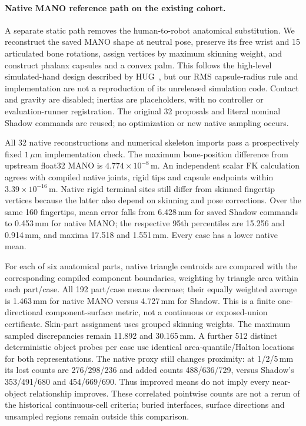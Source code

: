 \documentclass[10pt,letterpaper]{article}
\begin{document}
\paragraph{Native MANO reference path on the existing cohort.}
A separate static path removes the human-to-robot anatomical substitution.
We reconstruct the saved MANO shape at neutral pose, preserve its free wrist
and 15 articulated bone rotations, assign vertices by maximum skinning
weight, and construct phalanx capsules and a convex palm. This follows the
high-level simulated-hand design described by HUG~\cite{hug}, but our RMS
capsule-radius rule and implementation are not a reproduction of its
unreleased simulation code. Contact and gravity are disabled; inertias are
placeholders, with no controller or evaluation-runner registration.
The original 32 proposals and literal nominal Shadow commands are reused;
no optimization or new native sampling occurs.

All 32 native reconstructions and numerical skeleton imports pass a
prospectively fixed $1\,\mu$m implementation check. The maximum bone-position
difference from upstream float32 MANO is $4.774\times10^{-8}$\,m. An independent
scalar FK calculation agrees with compiled native joints, rigid tips and
capsule endpoints within $3.39\times10^{-16}$\,m. Native rigid terminal sites
still differ from skinned fingertip vertices because the latter also depend
on skinning and pose corrections. Over the same 160 fingertips, mean error
falls from 6.428\,mm for saved Shadow commands to 0.453\,mm for native MANO;
the respective 95th percentiles are 15.256 and 0.914\,mm, and maxima 17.518
and 1.551\,mm. Every case has a lower native mean.

For each of six anatomical parts, native triangle centroids are compared
with the corresponding compiled component boundaries, weighting by triangle
area within each part/case. All 192 part/case means decrease; their equally
weighted average is 1.463\,mm for native MANO versus 4.727\,mm for Shadow.
This is a finite one-directional component-surface metric, not a continuous
or exposed-union certificate. Skin-part assignment uses grouped skinning
weights. The maximum sampled discrepancies remain 11.892 and 30.165\,mm.
A further 512 distinct deterministic object probes per case use identical
area-quantile/Halton locations for both representations. The native proxy
still changes proximity: at 1/2/5\,mm its lost counts are 276/298/236 and
added counts 488/636/729, versus Shadow's 353/491/680 and 454/669/690.
Thus improved means do not imply every near-object relationship improves.
These correlated pointwise counts are not a rerun of the historical
continuous-cell criteria; buried interfaces, surface directions and unsampled
regions remain outside this comparison.
\end{document}
